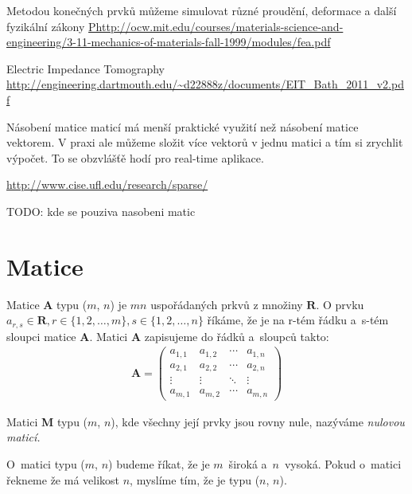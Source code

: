 Metodou konečných prvků můžeme simulovat různé proudění, deformace a další fyzikální zákony
\url{Phttp://ocw.mit.edu/courses/materials-science-and-engineering/3-11-mechanics-of-materials-fall-1999/modules/fea.pdf}

Electric Impedance Tomography
\url{http://engineering.dartmouth.edu/~d22888z/documents/EIT_Bath_2011_v2.pdf}


Násobení matice maticí má menší praktické využití než násobení matice vektorem. V praxi ale můžeme složit více vektorů v jednu matici a tím si zrychlit výpočet. To se obzvlášťě hodí pro real-time aplikace.





\url{http://www.cise.ufl.edu/research/sparse/}


TODO: kde se pouziva nasobeni matic

\section{Matice}

Matice \textbf{A} typu ($m$, $n$) je $m n$ uspořádaných prkvů z množiny $\mathbf{R}$. O prvku $a_{r,s} \in \mathbf{R}, r \in \{1,2,\hdots,m\},s \in \{1,2,\hdots,n\}$ říkáme, že je na r-tém řádku a~s-tém sloupci matice \textbf{A}. Matici \textbf{A} zapisujeme do řádků a~sloupců takto:
\begin{align}
\mathbf{A}=\begin{pmatrix}
a_{1,1} & a_{1,2} & \cdots & a_{1,n} \\
a_{2,1} & a_{2,2} & \cdots & a_{2,n} \\
\vdots  & \vdots  & \ddots & \vdots  \\
a_{m,1} & a_{m,2} & \cdots & a_{m,n}
\end{pmatrix}
\end{align}

Matici \textbf{M} typu ($m$, $n$), kde všechny její prvky jsou rovny nule, nazýváme \textit{nulovou maticí.}

O~matici typu ($m$, $n$) budeme říkat, že je $m$~široká a~$n$~vysoká. Pokud o~matici řekneme že má velikost $n$, myslíme tím, že je typu ($n$, $n$).

